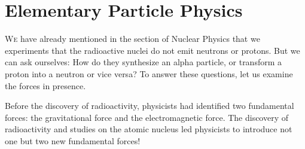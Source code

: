 	\newpage
	\thispagestyle{empty}
	\mbox{}
	\section{Elementary Particle Physics}\label{elementary particle physics}
	\lettrine[lines=4]{\color{BrickRed}W}e have already mentioned in the section of Nuclear Physics that we experiments  that the radioactive nuclei do not emit neutrons or protons. But we can ask ourselves: How do they synthesize an alpha particle, or transform a proton into a neutron or vice versa? To answer these questions, let us examine the forces in presence.
	
	Before the discovery of radioactivity, physicists had identified two fundamental forces: the gravitational force and the electromagnetic force. The discovery of radioactivity and studies on the atomic nucleus led physicists to introduce not one but two new fundamental forces!
	

